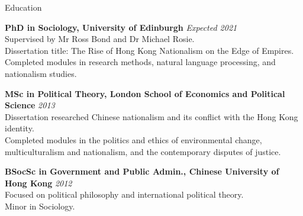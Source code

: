 \documentclass{resume} %
\begin{document}

\begin{rSection}{Education}

{\bf PhD in Sociology, University of Edinburgh} \hfill {\em Expected 2021} \\ 
Supervised by Mr Ross Bond and Dr Michael Rosie. \\
Dissertation title: The Rise of Hong Kong Nationalism on the Edge of Empires. \\
Completed modules in research methods, natural language processing, and nationalism studies.

{\bf MSc in Political Theory, London School of Economics and Political Science} \hfill {\em 2013} \\ 
Dissertation researched Chinese nationalism and its conflict with the Hong Kong identity. \\
Completed modules in the politics and ethics of environmental change, multiculturalism and
nationalism, and the contemporary disputes of justice.

{\bf BSocSc in Government and Public Admin., Chinese University of Hong Kong} \hfill {\em 2012} \\ 
Focused on political philosophy and international political theory. \\
Minor in Sociology. \\

\end{rSection}


\end{document}
